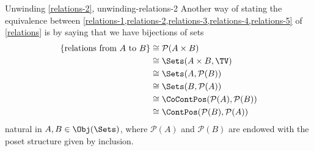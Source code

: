 \begin{remark}{Unwinding \cref{relations-2}, \rmII}{unwinding-relations-2}%
    Another way of stating the equivalence between \cref{relations-1,relations-2,relations-3,relations-4,relations-5} of \cref{relations} is by saying that we have bijections of sets
    \begin{align*}
        \{\text{relations from $A$ to $B$}\} &\cong \mathcal{P}(A\times B)\\
                                             &\cong \Sets(A\times B,\TV)\\
                                             &\cong \Sets(A,\mathcal{P}(B))\\
                                             &\cong \Sets(B,\mathcal{P}(A))\\
                                             &\cong \CoContPos(\mathcal{P}(A),\mathcal{P}(B))\\
                                             &\cong \ContPos(\mathcal{P}(B),\mathcal{P}(A))
    \end{align*}
    natural in $A,B\in\Obj(\Sets)$, where $\mathcal{P}(A)$ and $\mathcal{P}(B)$ are endowed with the poset structure given by inclusion.
\end{remark}
